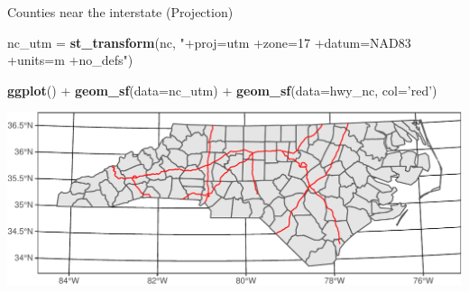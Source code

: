 \documentclass[11pt,ignorenonframetext,]{beamer}
\newenvironment{Shaded}{}{}
\newcommand{\DataTypeTok}[1]{\textcolor[rgb]{0.56,0.13,0.00}{#1}}
\newcommand{\KeywordTok}[1]{\textcolor[rgb]{0.00,0.44,0.13}{\textbf{#1}}}
\newcommand{\NormalTok}[1]{#1}
\newcommand{\OperatorTok}[1]{\textcolor[rgb]{0.40,0.40,0.40}{#1}}
\newcommand{\StringTok}[1]{\textcolor[rgb]{0.25,0.44,0.63}{#1}}
\let\oldShaded\Shaded
\let\endoldShaded\endShaded
\renewenvironment{Shaded}{\footnotesize\begin{spacing}{0.9}\oldShaded}{\endoldShaded\end{spacing}}
\let\oldverbatim\verbatim
\let\endoldverbatim\endverbatim
\newcommand{\scriptoutput}{
  \renewenvironment{Shaded}{\scriptsize\begin{spacing}{0.9}\oldShaded}{\endoldShaded\end{spacing}}
  \renewenvironment{verbatim}{\scriptsize\begin{spacing}{0.9}\oldverbatim}{\endoldverbatim\end{spacing}}
}
\begin{document}
\begin{frame}[fragile,t]{Counties near the interstate (Projection)}
\protect\hypertarget{counties-near-the-interstate-projection}{}

\scriptoutput

\begin{Shaded}
\begin{Highlighting}[]
\NormalTok{nc_utm  =}\StringTok{ }\KeywordTok{st_transform}\NormalTok{(nc, }\StringTok{"+proj=utm +zone=17 +datum=NAD83 +units=m +no_defs"}\NormalTok{)}

\KeywordTok{ggplot}\NormalTok{() }\OperatorTok{+}\StringTok{ }
\StringTok{  }\KeywordTok{geom_sf}\NormalTok{(}\DataTypeTok{data=}\NormalTok{nc_utm) }\OperatorTok{+}
\StringTok{  }\KeywordTok{geom_sf}\NormalTok{(}\DataTypeTok{data=}\NormalTok{hwy_nc, }\DataTypeTok{col=}\StringTok{'red'}\NormalTok{)}
\end{Highlighting}
\end{Shaded}

\begin{center}\includegraphics[width=\textwidth]{Lec16_files/figure-beamer/unnamed-chunk-31-1} \end{center}

\end{frame}
\end{document}
